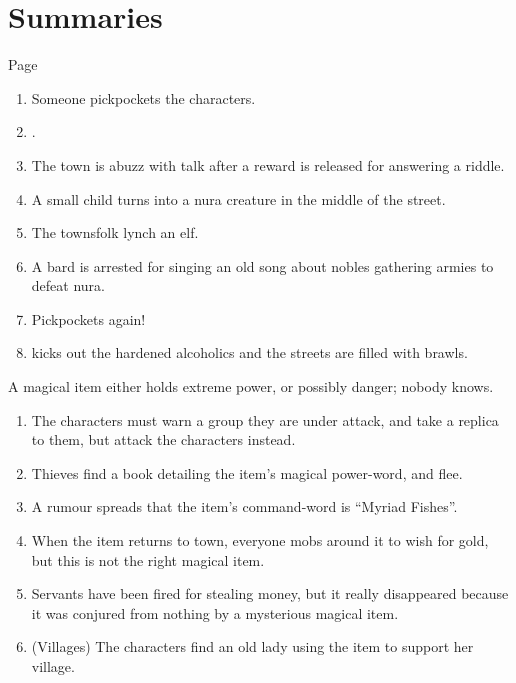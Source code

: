 \setcounter{encnum}{1}
\section{Summaries}


Page \pageref{randommeetings}

\begin{enumerate}

	\item{Someone pickpockets the characters.}
	\item{.}
	\item{The town is abuzz with talk after a reward is released for answering a riddle.}
	\item{ A small child turns into a nura creature in the middle of the street.}
	\item{The townsfolk lynch an elf.}
	\item{A bard is arrested for singing an old song about nobles gathering armies to defeat nura.}

	\item{ Pickpockets again!}
	\item{ kicks out the hardened alcoholics and the streets are filled with brawls.}
\end{enumerate}

A magical item either holds extreme power, or possibly danger; nobody knows.

\begin{enumerate}

	\item{The characters must warn a group they are under attack, and take a replica to them, but attack the characters instead.}
	\item{Thieves find a book detailing the item's magical power-word, and flee.}
	\item{A rumour spreads that the item's command-word is ``Myriad Fishes''.}
	\item{When the item returns to town, everyone mobs around it to wish for gold, but this is not the right magical item.}
	\item{Servants have been fired for stealing money, but it really disappeared because it was conjured from nothing by a mysterious magical item.}
	\item{(Villages) The characters find an old lady using the item to support her village.}
\end{enumerate}


